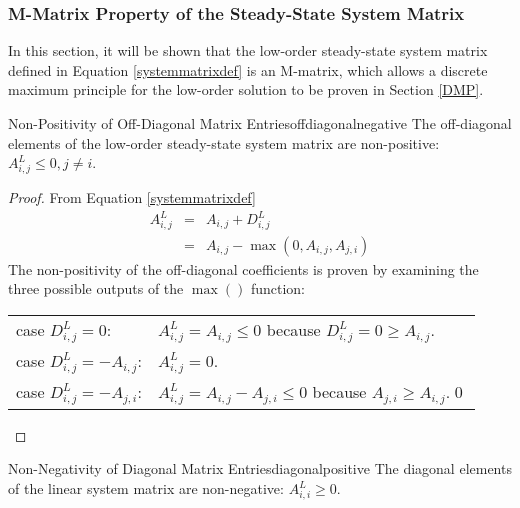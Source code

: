 \subsubsection{M-Matrix Property of the Steady-State System Matrix}
In this section, it will be shown that the low-order steady-state
system matrix defined in Equation \eqref{systemmatrixdef} is an M-matrix, which
allows a discrete maximum principle for the low-order solution to be proven in
Section \ref{DMP}.
\begin{lemma}{Non-Positivity of Off-Diagonal Matrix Entries}{offdiagonalnegative}
   The off-diagonal elements of the low-order steady-state system matrix
   are non-positive: $A^L_{i,j}\le 0, j\ne i$.
\end{lemma}
\begin{proof}
From Equation \eqref{systemmatrixdef}
\begin{eqnarray*}
	A^L_{i,j} & = & A_{i,j} + D_{i,j}^L\\
             & = & A_{i,j} - \max(0,A_{i,j},A_{j,i})
\end{eqnarray*}
The non-positivity of the off-diagonal coefficients is proven by examining the three possible
outputs of the $\max()$ function:

\begin{tabular}{l l}
   case $D_{i,j}^L=0$:        & $A^L_{i,j} = A_{i,j} \leq 0$ because
      $D_{i,j}^L=0\geq A_{i,j}$.\\
   case $D_{i,j}^L=-A_{i,j}$: & $A^L_{i,j} = 0$.\\
   case $D_{i,j}^L=-A_{j,i}$: & $A^L_{i,j} = A_{i,j} - A_{j,i} \leq 0$ because
      $A_{j,i} \geq A_{i,j}$.\qed
\end{tabular}
\end{proof}
\begin{lemma}{Non-Negativity of Diagonal Matrix Entries}{diagonalpositive}
   The diagonal elements of the linear system matrix are non-negative: $A^L_{i,i}\ge 0$.
\end{lemma}
